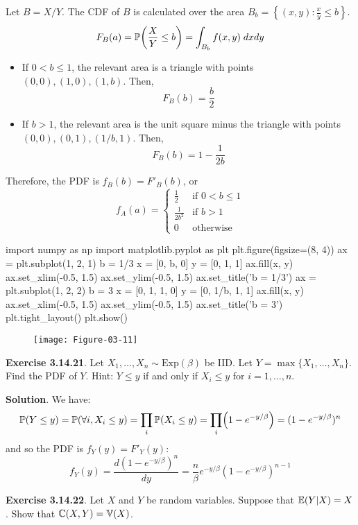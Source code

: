 Let \(B = X/Y\). The CDF of \(B\) is calculated over the area
\(B_b = \left\{ (x, y) : \frac{x}{y} \leq b \right\}\).
\[
F_B(a) = \PROB\left(\frac{X}{Y} \leq b\right) = \int_{B_b} f(x, y)\; dx dy
\]
\begin{itemize}
\item
  If \(0 < b \leq 1\), the relevant area is a triangle with points
  \((0, 0), (1, 0), (1, b)\). Then,
  \[
F_B(b) = \frac{b}{2}
\]
\item
  If \(b > 1\), the relevant area is the unit square minus the triangle
  with points \((0, 0), (0, 1), (1/b, 1)\). Then,
  \[
F_B(b) = 1 - \frac{1}{2b}
\]
\end{itemize}
Therefore, the PDF is \(f_B(b) = F'_B(b)\), or
\[
f_A(a) =
\begin{cases}
\frac{1}{2} &\text{if } 0 < b \leq 1
\\[
1ex]
\frac{1}{2b^{2}} &\text{if } b > 1
\\[
1ex]
0 &\text{otherwise}
\end{cases}
\]

\begin{python}
import numpy as np
import matplotlib.pyplot as plt
plt.figure(figsize=(8, 4))
ax = plt.subplot(1, 2, 1)
b = 1/3
x = [0, b, 0]
y = [0, 1, 1]
ax.fill(x, y)
ax.set_xlim(-0.5, 1.5)
ax.set_ylim(-0.5, 1.5)
ax.set_title('b = 1/3')
ax = plt.subplot(1, 2, 2)
b = 3
x = [0, 1, 1, 0]
y = [0, 1/b, 1, 1]
ax.fill(x, y)
ax.set_xlim(-0.5, 1.5)
ax.set_ylim(-0.5, 1.5)
ax.set_title('b = 3')
plt.tight_layout()
plt.show()
\end{python}

\begin{figure}[H]
\centering
\texttt{[image: Figure-03-11]}
\end{figure}


\textbf{Exercise 3.14.21}. Let
\(X_{1}, \dots, X_{n} \sim \text{Exp}(\beta)\) be IID. Let
\(Y = \max \{ X_{1}, \dots, X_{n} \}\). Find the PDF of \(Y\). Hint:
\(Y \leq y\) if and only if \(X_{i} \leq y\) for \(i = 1, \dots, n\).

\textbf{Solution}. We have:
\[
\PROB(Y \leq y) = \PROB(\forall i, X_{i} \leq y) = \prod_{i} \PROB(X_{i} \leq y) = \prod_{i} \left(1 - e^{-y/\beta}\right) = (1 - e^{-y/\beta})^{n}
\]
and so the PDF is \(f_Y(y) = F'_Y(y)\):
\[
f_Y(y) = \frac{d (1 - e^{-y/\beta})^{n}}{dy} = \frac{n}{\beta} e^{-y/\beta} (1 - e^{-y/\beta})^{n-1}
\]

\textbf{Exercise 3.14.22}. Let \(X\) and \(Y\) be random variables.
Suppose that \(\operatorname{\mathbb{E}}(Y | X) = X\). Show that
\(\operatorname{\mathbb{C}}(X, Y) = \operatorname{\mathbb{V}}(X)\).

